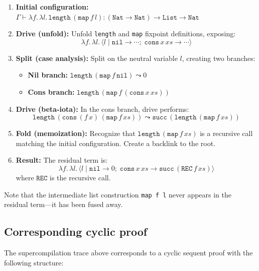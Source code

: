 \begin{enumerate}
\item \textbf{Initial configuration:} $\Gamma \vdash \lambda f.\, \lambda l.\, \mathtt{length}\,(\mathtt{map}\,f\,l) : (\mathtt{Nat} \to \mathtt{Nat}) \to \mathtt{List} \to \mathtt{Nat}$

\item \textbf{Drive (unfold):} Unfold \texttt{length} and \texttt{map} fixpoint definitions, exposing:
\[
\lambda f.\, \lambda l.\, \langle l \mid \mathtt{nil} \to \cdots;\; \mathtt{cons}\,x\,xs \to \cdots \rangle
\]

\item \textbf{Split (case analysis):} Split on the neutral variable $l$, creating two branches:
\begin{itemize}
  \item \textbf{Nil branch:} $\mathtt{length}\,(\mathtt{map}\,f\,\mathtt{nil}) \leadsto 0$
  \item \textbf{Cons branch:} $\mathtt{length}\,(\mathtt{map}\,f\,(\mathtt{cons}\,x\,xs))$
\end{itemize}

\item \textbf{Drive (beta-iota):} In the cons branch, drive performs:
\[
\mathtt{length}\,(\mathtt{cons}\,(f\,x)\,(\mathtt{map}\,f\,xs)) \leadsto \mathtt{succ}\,(\mathtt{length}\,(\mathtt{map}\,f\,xs))
\]

\item \textbf{Fold (memoization):} Recognize that $\mathtt{length}\,(\mathtt{map}\,f\,xs)$ is a recursive call matching the initial configuration. Create a backlink to the root.

\item \textbf{Result:} The residual term is:
\[
\lambda f.\, \lambda l.\, \langle l \mid \mathtt{nil} \to 0;\; \mathtt{cons}\,x\,xs \to \mathtt{succ}\,(\mathtt{REC}\,f\,xs) \rangle
\]
where $\mathtt{REC}$ is the recursive call.
\end{enumerate}

Note that the intermediate list construction \texttt{map f l} never appears in the residual term---it has been fused away.

\subsection{Corresponding cyclic proof}

The supercompilation trace above corresponds to a cyclic sequent proof with the following structure:


